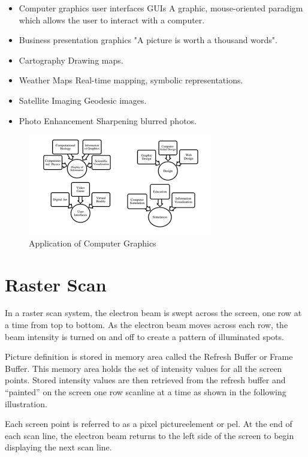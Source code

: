 \documentclass[a4paper]{article}
\begin{document}
  \begin{itemize}
    \item Computer graphics user interfaces GUIs  A graphic, mouse-oriented paradigm which allows the user to interact with a computer.
    \item Business presentation graphics  "A picture is worth a thousand words".
    \item  Cartography Drawing maps.
    \item Weather Maps  Real-time mapping, symbolic representations.
    \item Satellite Imaging  Geodesic images.
    \item Photo Enhancement  Sharpening blurred photos.
    
  \end{itemize}
  \begin{figure}[h]
  \centering
\includegraphics{ap}
\caption{Application of Computer Graphics}
\end{figure}

  \newpage
  \section{Raster Scan}
In a raster scan system, the electron beam is swept across the screen, one row at a time from top to bottom. As the electron beam moves across each row, the beam intensity is turned on and off to create a pattern of illuminated spots.

Picture definition is stored in memory area called the Refresh Buffer or Frame Buffer. This memory area holds the set of intensity values for all the screen points. Stored intensity values are then retrieved from the refresh buffer and “painted” on the screen one row scanline at a time as shown in the following illustration.

Each screen point is referred to as a pixel pictureelement or pel. At the end of each scan line, the electron beam returns to the left side of the screen to begin displaying the next scan line.
\end{document}
